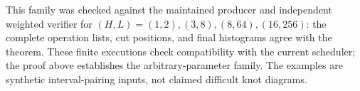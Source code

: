 This family was checked against the maintained producer and independent
weighted verifier for $(H,L)=(1,2),(3,8),(8,64),(16,256)$: the complete operation
lists, cut positions, and final histograms agree with the theorem. These
finite executions check compatibility with the current scheduler; the proof
above establishes the arbitrary-parameter family. The examples are synthetic
interval-pairing inputs, not claimed difficult knot diagrams.
